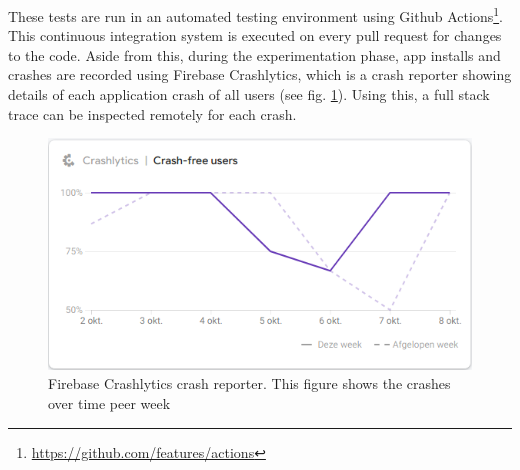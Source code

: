 These tests are run in an automated testing environment using Github Actions\footnote{\url{https://github.com/features/actions}}. This continuous integration system is executed on every pull request for changes to the code. Aside from this, during the experimentation phase, app installs and crashes are recorded using Firebase Crashlytics, which is a crash reporter showing details of each application crash of all users (see fig. \ref{fig:firebase-crashlytics}). Using this, a full stack trace can be inspected remotely for each crash.

\begin{figure}
    \includegraphics[width=0.55\linewidth]{implementation/firebase-crashlytics.png}
    \caption{Firebase Crashlytics crash reporter. This figure shows the crashes over time peer week}
    \label{fig:firebase-crashlytics}
\end{figure}